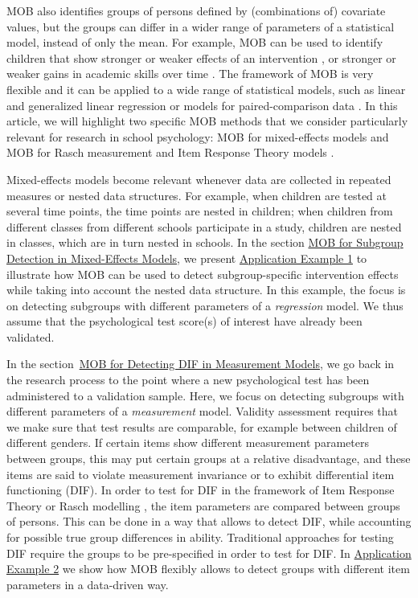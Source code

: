 \documentclass[doc,floatsintext,natbib]{apa7}
\begin{document}
MOB also identifies groups of persons defined by (combinations of) covariate values, but the groups can differ in a wider range of parameters of a statistical model, instead of only the mean. For example, MOB can be used to identify children that show stronger or weaker effects of an intervention \cite{ChunyAnso21}, or stronger or weaker gains in academic skills over time \cite{FokkyZeil24}. The framework of MOB is very flexible and it can be applied to a wide range of statistical models, such as linear and generalized linear regression \citep{KopAugStr:2013,ZeilyHoth08} or models for paired-comparison data \citep{StrWicZei:2011:JoEaBS,WiedyFrick21}. In this article, we will highlight two specific MOB methods that we consider particularly relevant for research in school psychology: MOB for mixed-effects models \citep{FokkySmit18} and MOB for Rasch measurement and Item Response Theory models \citep[IRT,][]{StrKopZei:2015:P,KomStrZei:2017:EaPM,HenDebStr:2023:EPM}. 

Mixed-effects models become relevant whenever data are collected in repeated measures or nested data structures. For example, when children are tested at several time points, the time points are nested in children; when children from different classes from different schools participate in a study, children are nested in classes, which are in turn nested in schools. In the section \hyperref[sec:glmmtree]{MOB for Subgroup Detection in Mixed-Effects Models}, we present \hyperref[sec:TutorialMixed]{Application Example 1} to illustrate how MOB can be used to detect subgroup-specific intervention effects while taking into account the nested data structure. In this example, the focus is on detecting subgroups with different parameters of a \textit{regression} model. We thus assume that the psychological test score(s) of interest have already been validated. 

In the section~\hyperref[sec:raschtree]{MOB for Detecting DIF in Measurement Models}, we go back in the research process to the point where a new psychological test has been administered to a validation sample. Here, we focus on detecting subgroups with different parameters of a \textit{measurement} model. Validity assessment requires that we make sure that test results are comparable, for example between children of different genders. If certain items show different measurement parameters between groups, this may put certain groups at a relative disadvantage, and these items are said to violate measurement invariance or to exhibit differential item functioning (DIF). In order to test for DIF in the framework of Item Response Theory or Rasch modelling \citep{AnthyDiPe16,DebStrZei:2022:CRC,Mall97}, the item parameters are compared between groups of persons. This can be done in a way that allows to detect DIF, while accounting for possible true group differences in ability. Traditional approaches for testing DIF require the groups to be pre-specified in order to test for DIF. In \hyperref[sec:TutorialRasch]{Application Example 2} we show how MOB flexibly allows to detect groups with different item parameters in a data-driven way. 
\end{document}
